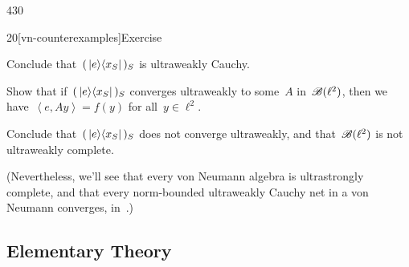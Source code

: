 \begin{parsec}{430}
\begin{point}{20}[vn-counterexamples]{Exercise}
\begin{enumerate}
Conclude that~$(\,\left|e\right>\!\left<x_S\right|\,)_S$
is ultraweakly Cauchy.

Show that if~$(\,\left|e\right>\!\left<x_S\right|\,)_S$
converges ultraweakly to some~$A$ in~$\mathscr{B}(\ell^2)$,
then we have~$\left<e,Ay\right>=f(y)$
for all~$y\in\ell^2$.

Conclude that~$(\,\left|e\right>\!\left<x_S\right|\,)_S$
does not converge ultraweakly,
and that~$\mathscr{B}(\ell^2)$ is not ultraweakly complete.

(Nevertheless, we'll see that every von Neumann algebra
is ultrastrongly complete, and that
every norm-bounded ultraweakly Cauchy net
in a von Neumann converges, in~.)
\end{enumerate}
\spacingfix%
\end{point}%
\end{parsec}%
\subsection{Elementary Theory}
%
%
